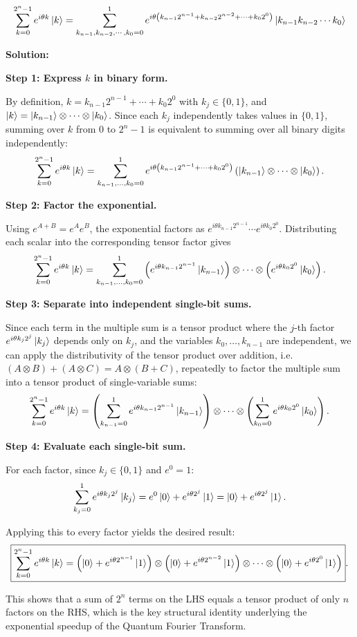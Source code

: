 \documentclass[11pt]{article}
\newenvironment{solution}
{\par\noindent\textbf{Solution:}\par}
{\vspace{1em}}
\begin{document}
\[\sum_{k=0}^{2^n-1} e^{i\theta k}\ket{k} = \sum_{k_{n-1},k_{n-2},\cdots,k_0=0}^1 e^{i\theta \left(k_{n-1}2^{n-1} + k_{n-2}2^{n-2} + \cdots + k_0 2^0\right)}\ket{k_{n-1}k_{n-2}\cdots k_0}\]

\begin{solution}

\textbf{Step 1: Express \(k\) in binary form.}

By definition, $k=k_{n-1}2^{n-1}+\cdots+k_0 2^0$ with $k_j\in\{0,1\}$, and $\ket{k}=\ket{k_{n-1}}\otimes\cdots\otimes\ket{k_0}$. Since each $k_j$ independently takes values in $\{0,1\}$, summing over $k$ from $0$ to $2^n-1$ is equivalent to summing over all binary digits independently:
\[
\sum_{k=0}^{2^n-1} e^{i\theta k}\ket{k}
=
\sum_{k_{n-1},\dots,k_0=0}^1
e^{i\theta\left(k_{n-1}2^{n-1}+\cdots+k_0 2^0\right)}
\left(\ket{k_{n-1}}\otimes\cdots\otimes\ket{k_0}\right).
\]

\textbf{Step 2: Factor the exponential.}

Using $e^{A+B}=e^Ae^B$, the exponential factors as $e^{i\theta k_{n-1}2^{n-1}}\cdots e^{i\theta k_0 2^0}$. Distributing each scalar into the corresponding tensor factor gives
\[
\sum_{k=0}^{2^n-1} e^{i\theta k}\ket{k}
=
\sum_{k_{n-1},\dots,k_0=0}^1
\left(e^{i\theta k_{n-1}2^{n-1}}\ket{k_{n-1}}\right)
\otimes\cdots\otimes
\left(e^{i\theta k_0 2^0}\ket{k_0}\right).
\]

\textbf{Step 3: Separate into independent single-bit sums.}

Since each term in the multiple sum is a tensor product where the $j$-th factor $e^{i\theta k_j 2^j}\ket{k_j}$ depends only on $k_j$, and the variables $k_0,\dots,k_{n-1}$ are independent, we can apply the distributivity of the tensor product over addition, i.e.\ $(A\otimes B)+(A\otimes C)=A\otimes(B+C)$, repeatedly to factor the multiple sum into a tensor product of single-variable sums:
\[
\sum_{k=0}^{2^n-1} e^{i\theta k}\ket{k}
=
\left(\sum_{k_{n-1}=0}^1 e^{i\theta k_{n-1}2^{n-1}}\ket{k_{n-1}}\right)
\otimes\cdots\otimes
\left(\sum_{k_0=0}^1 e^{i\theta k_0 2^0}\ket{k_0}\right).
\]

\textbf{Step 4: Evaluate each single-bit sum.}

For each factor, since $k_j\in\{0,1\}$ and $e^0=1$:
\[
\sum_{k_j=0}^1 e^{i\theta k_j 2^j}\ket{k_j}
= e^0\ket{0}+e^{i\theta 2^j}\ket{1}
= \ket{0}+e^{i\theta 2^j}\ket{1}.
\]

Applying this to every factor yields the desired result:
\[
\boxed{
\sum_{k=0}^{2^n-1} e^{i\theta k}\ket{k}
=
\left(\ket{0}+e^{i\theta 2^{n-1}}\ket{1}\right)\otimes
\left(\ket{0}+e^{i\theta 2^{n-2}}\ket{1}\right)\otimes\cdots\otimes
\left(\ket{0}+e^{i\theta 2^0}\ket{1}\right)
}.
\]

This shows that a sum of $2^n$ terms on the LHS equals a tensor product of only $n$ factors on the RHS, which is the key structural identity underlying the exponential speedup of the Quantum Fourier Transform.

\end{solution}
\end{document}
